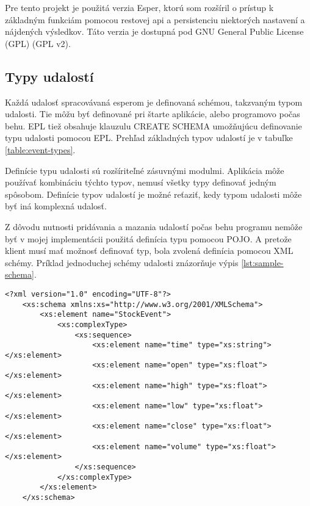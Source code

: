 	Pre tento projekt je použitá verzia Esper, ktorú som rozšíril o prístup k základným funkciám pomocou restovej api a persistenciu niektorých nastavení a nájdených výsledkov. Táto verzia je dostupná pod GNU General Public License (GPL) (GPL v2).

	\subsection{Typy udalostí}
	Každá udalosť spracovávaná esperom je definovaná schémou, takzvaným typom udalosti. Tie môžu byť definované pri štarte aplikácie, alebo programovo počas behu. EPL tiež obsahuje klauzulu CREATE SCHEMA umožňujúcu definovanie typu udalosti pomocou EPL. Prehľad základných typov udalostí je v tabuľke \ref{table:event-types}.

	
	Definície typu udalosti sú rozšíriteľné zásuvnými modulmi. Aplikácia môže používať kombináciu týchto typov, nemusí všetky typy definovať jedným spôsobom. Definície typov udalostí je možné reťaziť, kedy typom udalosti môže byť iná komplexná udalosť.
	
	Z dôvodu nutnosti pridávania a mazania udalostí počas behu programu nemôže byť v mojej implementácii použitá definícia typu pomocou POJO. A pretože klient musí mať možnosť definovať typ, bola zvolená definícia pomocou XML schémy. Príklad jednoduchej schémy udalosti znázorňuje výpis \ref{lst:sample-schema}.
	
	\begin{lstlisting}[label=lst:sample-schema,caption=Príklad XML schémy udalosti]
	<?xml version="1.0" encoding="UTF-8"?>
	<xs:schema xmlns:xs="http://www.w3.org/2001/XMLSchema">
		<xs:element name="StockEvent">
			<xs:complexType>
				<xs:sequence>
			        <xs:element name="time" type="xs:string"></xs:element>
			        <xs:element name="open" type="xs:float"></xs:element>
			        <xs:element name="high" type="xs:float"></xs:element>
			        <xs:element name="low" type="xs:float"></xs:element>
			        <xs:element name="close" type="xs:float"></xs:element>
			        <xs:element name="volume" type="xs:float"></xs:element>
				</xs:sequence>
			</xs:complexType>
		</xs:element>
	</xs:schema>	
	\end{lstlisting}
	
